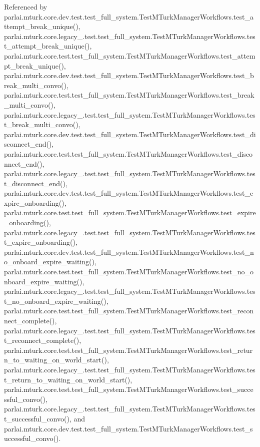 Referenced by parlai.\+mturk.\+core.\+dev.\+test.\+test\+\_\+full\+\_\+system.\+Test\+M\+Turk\+Manager\+Workflows.\+test\+\_\+attempt\+\_\+break\+\_\+unique(), parlai.\+mturk.\+core.\+legacy\+\_.\+test.\+test\+\_\+full\+\_\+system.\+Test\+M\+Turk\+Manager\+Workflows.\+test\+\_\+attempt\+\_\+break\+\_\+unique(), parlai.\+mturk.\+core.\+test.\+test\+\_\+full\+\_\+system.\+Test\+M\+Turk\+Manager\+Workflows.\+test\+\_\+attempt\+\_\+break\+\_\+unique(), parlai.\+mturk.\+core.\+dev.\+test.\+test\+\_\+full\+\_\+system.\+Test\+M\+Turk\+Manager\+Workflows.\+test\+\_\+break\+\_\+multi\+\_\+convo(), parlai.\+mturk.\+core.\+test.\+test\+\_\+full\+\_\+system.\+Test\+M\+Turk\+Manager\+Workflows.\+test\+\_\+break\+\_\+multi\+\_\+convo(), parlai.\+mturk.\+core.\+legacy\+\_.\+test.\+test\+\_\+full\+\_\+system.\+Test\+M\+Turk\+Manager\+Workflows.\+test\+\_\+break\+\_\+multi\+\_\+convo(), parlai.\+mturk.\+core.\+dev.\+test.\+test\+\_\+full\+\_\+system.\+Test\+M\+Turk\+Manager\+Workflows.\+test\+\_\+disconnect\+\_\+end(), parlai.\+mturk.\+core.\+test.\+test\+\_\+full\+\_\+system.\+Test\+M\+Turk\+Manager\+Workflows.\+test\+\_\+disconnect\+\_\+end(), parlai.\+mturk.\+core.\+legacy\+\_.\+test.\+test\+\_\+full\+\_\+system.\+Test\+M\+Turk\+Manager\+Workflows.\+test\+\_\+disconnect\+\_\+end(), parlai.\+mturk.\+core.\+dev.\+test.\+test\+\_\+full\+\_\+system.\+Test\+M\+Turk\+Manager\+Workflows.\+test\+\_\+expire\+\_\+onboarding(), parlai.\+mturk.\+core.\+test.\+test\+\_\+full\+\_\+system.\+Test\+M\+Turk\+Manager\+Workflows.\+test\+\_\+expire\+\_\+onboarding(), parlai.\+mturk.\+core.\+legacy\+\_.\+test.\+test\+\_\+full\+\_\+system.\+Test\+M\+Turk\+Manager\+Workflows.\+test\+\_\+expire\+\_\+onboarding(), parlai.\+mturk.\+core.\+dev.\+test.\+test\+\_\+full\+\_\+system.\+Test\+M\+Turk\+Manager\+Workflows.\+test\+\_\+no\+\_\+onboard\+\_\+expire\+\_\+waiting(), parlai.\+mturk.\+core.\+test.\+test\+\_\+full\+\_\+system.\+Test\+M\+Turk\+Manager\+Workflows.\+test\+\_\+no\+\_\+onboard\+\_\+expire\+\_\+waiting(), parlai.\+mturk.\+core.\+legacy\+\_.\+test.\+test\+\_\+full\+\_\+system.\+Test\+M\+Turk\+Manager\+Workflows.\+test\+\_\+no\+\_\+onboard\+\_\+expire\+\_\+waiting(), parlai.\+mturk.\+core.\+test.\+test\+\_\+full\+\_\+system.\+Test\+M\+Turk\+Manager\+Workflows.\+test\+\_\+reconnect\+\_\+complete(), parlai.\+mturk.\+core.\+legacy\+\_.\+test.\+test\+\_\+full\+\_\+system.\+Test\+M\+Turk\+Manager\+Workflows.\+test\+\_\+reconnect\+\_\+complete(), parlai.\+mturk.\+core.\+test.\+test\+\_\+full\+\_\+system.\+Test\+M\+Turk\+Manager\+Workflows.\+test\+\_\+return\+\_\+to\+\_\+waiting\+\_\+on\+\_\+world\+\_\+start(), parlai.\+mturk.\+core.\+legacy\+\_.\+test.\+test\+\_\+full\+\_\+system.\+Test\+M\+Turk\+Manager\+Workflows.\+test\+\_\+return\+\_\+to\+\_\+waiting\+\_\+on\+\_\+world\+\_\+start(), parlai.\+mturk.\+core.\+test.\+test\+\_\+full\+\_\+system.\+Test\+M\+Turk\+Manager\+Workflows.\+test\+\_\+successful\+\_\+convo(), parlai.\+mturk.\+core.\+legacy\+\_.\+test.\+test\+\_\+full\+\_\+system.\+Test\+M\+Turk\+Manager\+Workflows.\+test\+\_\+successful\+\_\+convo(), and parlai.\+mturk.\+core.\+dev.\+test.\+test\+\_\+full\+\_\+system.\+Test\+M\+Turk\+Manager\+Workflows.\+test\+\_\+successful\+\_\+convo().

